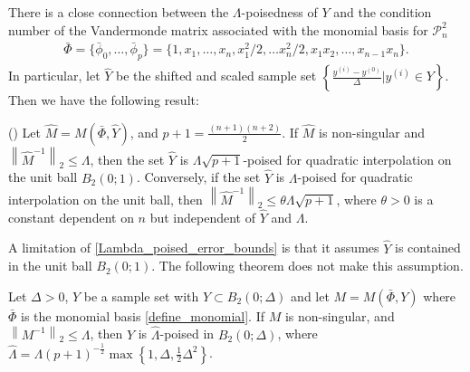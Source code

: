 \color{black}

There is a close connection between the $\Lambda$-poisedness of $Y$ and the condition number of the Vandermonde matrix 
associated with the monomial basis for $\mathcal{P}^2_n$
\begin{align}
\label{define_monomial}
\bar{\Phi} = \{ \bar{\phi}_0, \ldots, \bar{\phi}_p\} =\{1, x_1, \ldots, x_n, x_1^2/2, \ldots x_n^2/2,x_1 x_2, \ldots, x_{n-1}x_{n}\}.
\end{align}
In particular, let $\hat{Y}$ be the shifted and scaled sample set 
$\left\{\frac{y^{(i)}-y^{(0)}}{\Delta}|y^{(i)} \in Y\right\}$.
Then we have the following result:

\begin{theorem}
\label{Lambda_poised_error_bounds}

(\cite[Theorem 3.14]{introduction_book})
Let $\hat{M} = M(\bar{\Phi},\hat{Y})$, and $p + 1 = \frac{(n+1)(n+2)}{2}$.
If $\hat{M}$ is non-singular and $\left\|\hat{M}^{-1}\right\|_2 \le \Lambda$,   
then the set $\hat{Y}$ is $\Lambda  \sqrt{p+1}$-poised for quadratic interpolation on the unit ball $B_2(0;1)$.  
Conversely, if the set $\hat{Y}$ is $\Lambda$-poised for quadratic interpolation on the unit ball, 
then $\left\|\hat{M}^{-1}\right\|_2 \le \theta \Lambda \sqrt{p+1}$, where $\theta > 0$ is a 
constant dependent on $n$ but independent of $\hat{Y}$ and $\Lambda$.
\end{theorem}

A limitation of \cref{Lambda_poised_error_bounds} is that it assumes $\hat{Y}$ is contained in the unit ball $B_2(0;1)$.
The following theorem does not make this assumption.

\begin{theorem}
\label{Lambda_poised_error_bounds_delta}

Let $\Delta >0$, $Y$ be a sample set with $Y \subset B_2(0;\Delta)$ and let $M=M(\bar{\Phi},Y)$ where $\bar{\Phi}$ is the monomial basis \cref{define_monomial}.
If $M$ is non-singular, and $\left\|{M^{-1}}\right\|_2 \le \Lambda$, then $Y$ is $\hat{\Lambda}$-poised in $B_2(0;\Delta)$,
where $\hat{\Lambda} = \Lambda \left(p+1\right)^{-\frac 1 2}\max\left\{1, \Delta, \frac 1 2 \Delta^2\right\}$.
\end{theorem}

